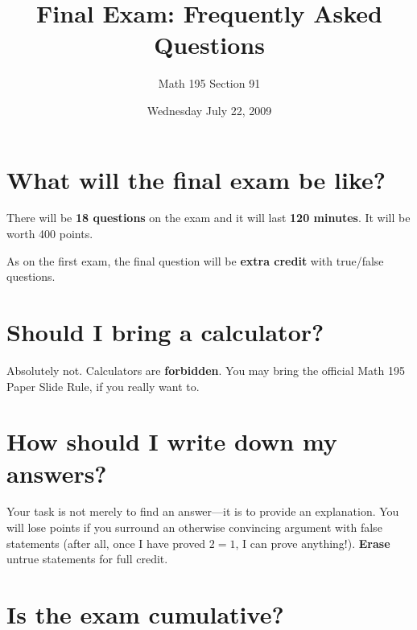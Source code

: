 \documentclass[12pt]{article}
\title{Final Exam: Frequently Asked Questions}
\author{Math 195 Section 91}
\date{Wednesday July 22, 2009}
\begin{document}
\maketitle

\section*{What will the final exam be like?}

There will be \textbf{18 questions} on the exam and it will last
\textbf{120 minutes}.  It will be worth 400 points.

As on the first exam, the final question will be \textbf{extra credit}
with true/false questions.

\section*{Should I bring a calculator?}

Absolutely not.  Calculators are \textbf{forbidden}.  You may bring
the official Math 195 Paper Slide Rule, if you really want to.

\section*{How should I write down my answers?}

Your task is not merely to find an answer---it is to provide an
explanation.  You will lose points if you surround an otherwise
convincing argument with false statements (after all, once I have
proved $2 = 1$, I can prove anything!).  \textbf{Erase} untrue
statements for full credit.

\section*{Is the exam cumulative?}
\end{document}
